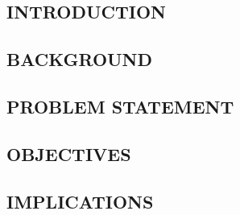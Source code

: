 \begin{center}
	\chapter{INTRODUCTION}
\end{center}

	
\section{BACKGROUND}
\par
\lipsum[1]

\section{PROBLEM STATEMENT}
\par
\lipsum[2]

\section{OBJECTIVES}
\par
\lipsum[3]

\section{IMPLICATIONS}
\par
\lipsum[4]